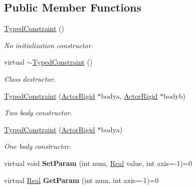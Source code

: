 \subsection*{Public Member Functions}
\begin{DoxyCompactItemize}
\item 
\hyperlink{classphys_1_1TypedConstraint_a499e2f94ca4ee111001efa0dd3862391}{TypedConstraint} ()
\begin{DoxyCompactList}\small\item\em No initialization constructor. \item\end{DoxyCompactList}\item 
virtual \hyperlink{classphys_1_1TypedConstraint_abf1cb6e3cf5c62feac31805162ec2766}{$\sim$TypedConstraint} ()
\begin{DoxyCompactList}\small\item\em Class destructor. \item\end{DoxyCompactList}\item 
\hyperlink{classphys_1_1TypedConstraint_a50ca8631a6c75bbc609c8d4ed61fdcee}{TypedConstraint} (\hyperlink{classphys_1_1ActorRigid}{ActorRigid} $\ast$bodya, \hyperlink{classphys_1_1ActorRigid}{ActorRigid} $\ast$bodyb)
\begin{DoxyCompactList}\small\item\em Two body constructor. \item\end{DoxyCompactList}\item 
\hyperlink{classphys_1_1TypedConstraint_a41ad08bfde377e91f2b37b0af40a9d34}{TypedConstraint} (\hyperlink{classphys_1_1ActorRigid}{ActorRigid} $\ast$bodya)
\begin{DoxyCompactList}\small\item\em One body constructor. \item\end{DoxyCompactList}\item 
\hypertarget{classphys_1_1TypedConstraint_a31a20a74094f0cb8e4f82d1f99725415}{
virtual void {\bfseries SetParam} (int num, \hyperlink{namespacephys_af7eb897198d265b8e868f45240230d5f}{Real} value, int axis=-\/1)=0}
\label{d1/d17/classphys_1_1TypedConstraint_a31a20a74094f0cb8e4f82d1f99725415}

\item 
\hypertarget{classphys_1_1TypedConstraint_ab6140d40e9476c3dc46e2802e8097421}{
virtual \hyperlink{namespacephys_af7eb897198d265b8e868f45240230d5f}{Real} {\bfseries GetParam} (int num, int axis=-\/1)=0}
\label{d1/d17/classphys_1_1TypedConstraint_ab6140d40e9476c3dc46e2802e8097421}

\end{DoxyCompactItemize}
